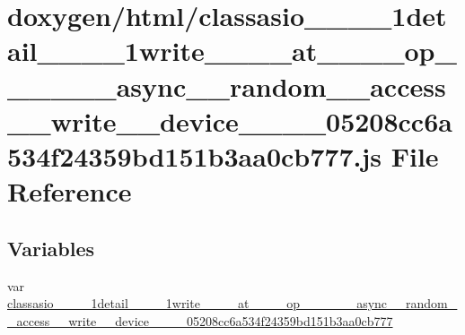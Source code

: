 \hypertarget{classasio____1____1detail____1____1write________at________op____3____01____async____random____ac52f11638b12c5c5a07ff736e5101db12}{}\section{doxygen/html/classasio\+\_\+\+\_\+\_\+\+\_\+1detail\+\_\+\+\_\+\_\+\+\_\+1write\+\_\+\+\_\+\+\_\+\+\_\+at\+\_\+\+\_\+\+\_\+\+\_\+op\+\_\+\+\_\+\_\+\+\_\+\_\+\+\_\+async\+\_\+\+\_\+random\+\_\+\+\_\+access\+\_\+\+\_\+write\+\_\+\+\_\+device\+\_\+\+\_\+\_\+\+\_\+05208cc6a534f24359bd151b3aa0cb777.js File Reference}
\label{classasio____1____1detail____1____1write________at________op____3____01____async____random____ac52f11638b12c5c5a07ff736e5101db12}
\subsection*{Variables}
\begin{DoxyCompactItemize}
\item 
var \hyperlink{classasio____1____1detail____1____1write________at________op____3____01____async____random____ac52f11638b12c5c5a07ff736e5101db12_ab4e02c1f3633b29670289fe965dc081f}{classasio\+\_\+\+\_\+\_\+\+\_\+1detail\+\_\+\+\_\+\_\+\+\_\+1write\+\_\+\+\_\+\+\_\+\+\_\+at\+\_\+\+\_\+\+\_\+\+\_\+op\+\_\+\+\_\+\_\+\+\_\+\_\+\+\_\+async\+\_\+\+\_\+random\+\_\+\+\_\+access\+\_\+\+\_\+write\+\_\+\+\_\+device\+\_\+\+\_\+\_\+\+\_\+05208cc6a534f24359bd151b3aa0cb777}
\end{DoxyCompactItemize}


